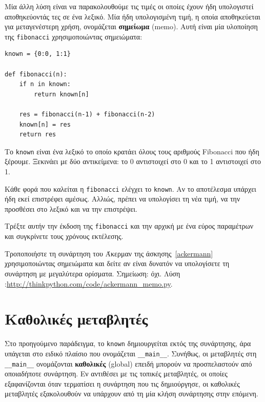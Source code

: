 \documentclass[10pt]{book}
\begin{document}
Μία άλλη λύση είναι να παρακολουθούμε τις τιμές οι οποίες έχουν ήδη υπολογιστεί αποθηκεύοντάς τες σε ένα λεξικό. Μία ήδη υπολογισμένη τιμή, η οποία αποθηκεύεται για μεταγενέστερη χρήση, ονομάζεται {\bf σημείωμα} (memo). Αυτή είναι μία υλοποίηση της {\tt fibonacci} χρησιμοποιώντας σημειώματα: 

\begin{verbatim}
known = {0:0, 1:1}

def fibonacci(n):
    if n in known:
        return known[n]

    res = fibonacci(n-1) + fibonacci(n-2)
    known[n] = res
    return res
\end{verbatim}
%
Το {\tt known} είναι ένα λεξικό το οποίο κρατάει όλους τους αριθμούς Fibonacci  που ήδη ξέρουμε. Ξεκινάει με δύο αντικείμενα: το 0 αντιστοιχεί στο 0 και το 1 αντιστοιχεί στο 1.

Κάθε φορά που καλείται η {\tt fibonacci} ελέγχει το {\tt known}. Αν το αποτέλεσμα υπάρχει ήδη εκεί επιστρέφει αμέσως. Αλλιώς, πρέπει να υπολογίσει τη νέα τιμή, να την προσθέσει στο λεξικό και να την επιστρέψει.
\\
\begin{exercise}

Τρέξτε αυτήν την έκδοση της {\tt fibonacci} και την αρχική με ένα εύρος παραμέτρων και συγκρίνετε τους χρόνους εκτέλεσης.\\

\end{exercise}

\begin{exercise}

Τροποποιήστε τη συνάρτηση του Άκερμαν της άσκησης~\ref{ackermann}  χρησιμοποιώντας σημειώματα και δείτε αν είναι δυνατόν να υπολογίσετε τη συνάρτηση με μεγαλύτερα ορίσματα. Σημείωση: όχι. Λύση :\url{http://thinkpython.com/code/ackermann_memo.py}.
\end{exercise}


 
\section{Καθολικές μεταβλητές}

Στο προηγούμενο παράδειγμα, το {\tt known} δημιουργείται εκτός της συνάρτησης, άρα υπάγεται στο ειδικό πλαίσιο που ονομάζεται \verb"__main__". Συνήθως, οι μεταβλητές στη \verb"__main__" ονομάζονται {\bf καθολικές} (global) επειδή μπορούν να προσπελαστούν από οποιαδήποτε συνάρτηση. Εν αντιθέσει με τις τοπικές μεταβλητές, οι οποίες εξαφανίζονται όταν τερματίσει η συνάρτηση που τις δημιούργησε, οι καθολικές μεταβλητές εξακολουθούν να υπάρχουν από τη μία κλήση συνάρτησης στην επόμενη.
\end{document}
